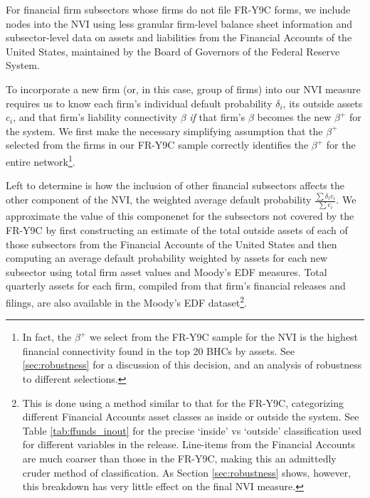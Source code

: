 For financial firm subsectors whose firms do not file FR-Y9C forms, we include nodes into the NVI using less granular firm-level balance sheet information and subsector-level data on assets and liabilities from the Financial Accounts of the United States, maintained by the Board of Governors of the Federal Reserve System.

To incorporate a new firm (or, in this case, group of firms) into our NVI measure requires us to know each firm's individual default probability $\delta_i$, its outside assets $c_i$, and that firm's liability connectivity $\beta$ \textit{if} that firm's $\beta$ becomes the new $\beta^+$ for the system. We first make the necessary simplifying assumption that the $\beta^+$ selected from the firms in our FR-Y9C sample correctly identifies the $\beta^+$ for the entire network\footnote{In fact, the $\beta^+$ we select from the FR-Y9C sample for the NVI is the highest financial connectivity found in the top 20 BHCs by assets. See \ref{sec:robustness} for a discussion of this decision, and an analysis of robustness to different selections.}.

Left to determine is how the inclusion of other financial subsectors affects the other component of the NVI, the weighted average default probability $\frac{\sum {\delta _{i}c_{i}}}{\sum {c_{i}}}$. We approximate the value of this componenet for the subsectors not covered by the FR-Y9C by first constructing an estimate of the total outside assets of each of those subsectors from the Financial Accounts of the United States and then computing an average default probability weighted by assets for each new subsector using total firm asset values and Moody's EDF measures. Total quarterly assets for each firm, compiled from that firm's financial releases and filings, are also available in the Moody's EDF dataset\footnote{This is done using a method similar to that for the FR-Y9C, categorizing different Financial Accounts asset classes as inside or outside the system. See Table \ref{tab:ffunds_inout} for the precise `inside' vs `outside' classification used for different variables in the release. Line-items from the Financial Accounts are much coarser than those in the FR-Y9C, making this an admittedly cruder method of classification. As Section \ref{sec:robustness} shows, however, this breakdown has very little effect on the final NVI measure.}.

